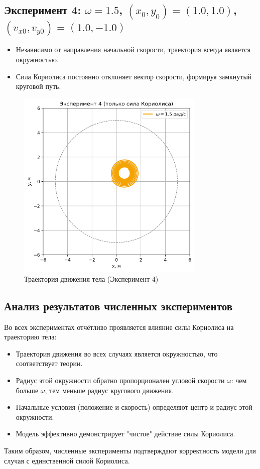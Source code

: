 \documentclass[a4paper,12pt]{article}
\begin{document}
\subsection*{Эксперимент 4: $\omega = 1.5$, $(x_0, y_0) = (1.0, 1.0)$, $(v_{x0}, v_{y0}) = (1.0, -1.0)$}
\begin{itemize}
    \item Независимо от направления начальной скорости, траектория всегда является окружностью.
    \item Сила Кориолиса постоянно отклоняет вектор скорости, формируя замкнутый круговой путь.
\end{itemize}
\begin{figure}[H]
    \centering
    \includegraphics[width=0.8\textwidth]{plots_coriolis_only/experiment_4.png}
    \caption{Траектория движения тела (Эксперимент 4)}
\end{figure}

\newpage

\subsection*{Анализ результатов численных экспериментов}
Во всех экспериментах отчётливо проявляется влияние силы Кориолиса на траекторию тела:
\begin{itemize}
    \item Траектория движения во всех случаях является окружностью, что соответствует теории.
    \item Радиус этой окружности обратно пропорционален угловой скорости $\omega$: чем больше $\omega$, тем меньше радиус кругового движения.
    \item Начальные условия (положение и скорость) определяют центр и радиус этой окружности.
    \item Модель эффективно демонстрирует "чистое" действие силы Кориолиса.
\end{itemize}
Таким образом, численные эксперименты подтверждают корректность модели для случая с единственной силой Кориолиса.
\end{document}

